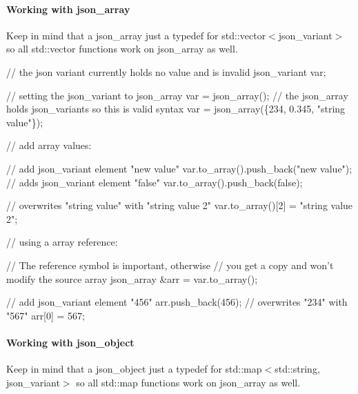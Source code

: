 \paragraph*{\label{_working_with_json_array_section}%
Working with json\+\_\+array}

Keep in mind that a {\ttfamily json\+\_\+array} just a {\ttfamily typedef} for {\ttfamily std\+::vector$<$json\+\_\+variant$>$} so all {\ttfamily std\+::vector} functions work on {\ttfamily json\+\_\+array} as well.


\begin{DoxyCode}
\textcolor{comment}{// the json variant currently holds no value and is invalid}
json\_variant var;

\textcolor{comment}{// setting the json\_variant to json\_array}
var = json\_array();
\textcolor{comment}{// the json\_array holds json\_variants so this is valid syntax}
var = json\_array(\{234, 0.345, \textcolor{stringliteral}{"string value"}\});

\textcolor{comment}{// add array values:}

\textcolor{comment}{// add json\_variant element "new value"}
var.to\_array().push\_back(\textcolor{stringliteral}{"new value"});
\textcolor{comment}{// adds json\_variant element "false"}
var.to\_array().push\_back(\textcolor{keyword}{false});                

\textcolor{comment}{// overwrites "string value" with "string value 2"}
var.to\_array()[2] = \textcolor{stringliteral}{"string value 2"};           

\textcolor{comment}{// using a array reference:}

\textcolor{comment}{// The reference symbol is important, otherwise }
\textcolor{comment}{// you get a copy and won't modify the source array}
json\_array &arr = var.to\_array();

\textcolor{comment}{// add json\_variant element "456"}
arr.push\_back(456);
 \textcolor{comment}{// overwrites "234" with "567"}
arr[0] = 567;     
\end{DoxyCode}


\paragraph*{\label{_working_with_json_object_section}%
Working with json\+\_\+object}

Keep in mind that a {\ttfamily json\+\_\+object} just a {\ttfamily typedef} for {\ttfamily std\+::map$<$std\+::string, json\+\_\+variant$>$} so all {\ttfamily std\+::map} functions work on {\ttfamily json\+\_\+array} as well.


